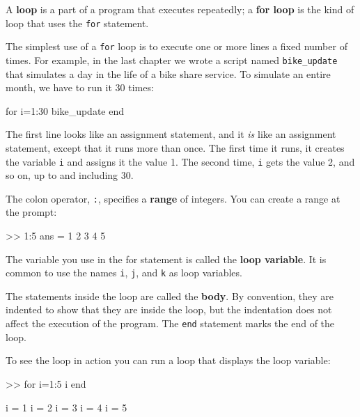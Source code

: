\documentclass[
]{book}
\numberwithin{Answer}{chapter}
\numberwithin{Exercise}{chapter}
\begin{document}

A {\bf loop} is a part of a program that executes repeatedly;
a {\bf for loop} is the kind of loop that uses the {\tt for}
statement.

The simplest use of a {\tt for} loop is to execute one or more
lines a fixed number of times.
For example, in the last chapter
we wrote a script named \verb"bike_update" that simulates a
day in the life of a bike share service.  To simulate an entire
month, we have to run it 30 times:

\begin{code}
for i=1:30
    bike_update
end
\end{code}

The first line looks like an assignment statement, and it {\em is}
like an assignment statement, except that it runs more than once.  The
first time it runs, it creates the variable {\tt i} and assigns it the
value 1.  The second time, {\tt i} gets the value 2, and so on, up to
and including 30.


The colon operator, {\tt :}, specifies a {\bf range} of integers.
You can create a range at the prompt:

\begin{code}
>> 1:5
ans =  1     2     3     4     5
\end{code}

The variable you use in the for statement is called the {\bf loop
variable}.  It is common to use the names {\tt i},
{\tt j}, and {\tt k} as loop variables.


The statements inside the loop are called the {\bf body}.  By convention,
they are indented to show that they are inside the loop, but the
indentation does not affect the execution of the program.
The {\tt end} statement marks the end of the loop.


To see the loop in action you can run a loop that displays the
loop variable:

\begin{code}
>> for i=1:5
    i
end

i = 1
i = 2
i = 3
i = 4
i = 5
\end{code}
\end{document}
